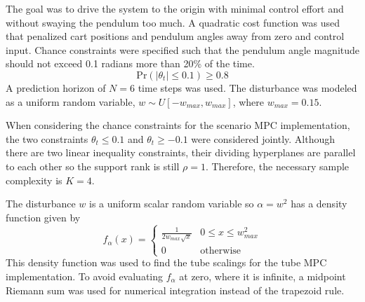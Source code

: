 \documentclass[12 pt]{report}
\begin{document}
The goal was to drive the system to the origin with minimal control effort and without swaying the pendulum too much. A quadratic cost function was used that penalized cart positions and pendulum angles away from zero and control input. Chance constraints were specified such that the pendulum angle magnitude should not exceed 0.1 radians more than 20\% of the time. $$ \mathrm{Pr}(|\theta_t| \leq 0.1) \geq 0.8$$ A prediction horizon of $N = 6$ time steps was used. The disturbance was modeled as a uniform random variable, $w \sim U[-w_{max}, w_{max}]$, where $w_{max} = 0.15$.

When considering the chance constraints for the scenario MPC implementation, the two constraints $\theta_t \leq 0.1$ and $\theta_t \geq -0.1$ were considered jointly. Although there are two linear inequality constraints, their dividing hyperplanes are parallel to each other so the support rank is still $\rho = 1$. Therefore, the necessary sample complexity is $K = 4$.

The disturbance $w$ is a uniform scalar random variable so $\alpha = w^2$ has a density function given by $$ f_\alpha (x) = \begin{cases}
\frac{1}{2w_{max}\sqrt{x}} & 0 \leq x \leq w_{max}^2 \\
0 &	\mathrm{otherwise}
\end{cases} $$
This density function was used to find the tube scalings for the tube MPC implementation. To avoid evaluating $f_\alpha$ at zero, where it is infinite, a midpoint Riemann sum was used for numerical integration instead of the trapezoid rule.





\end{document}
